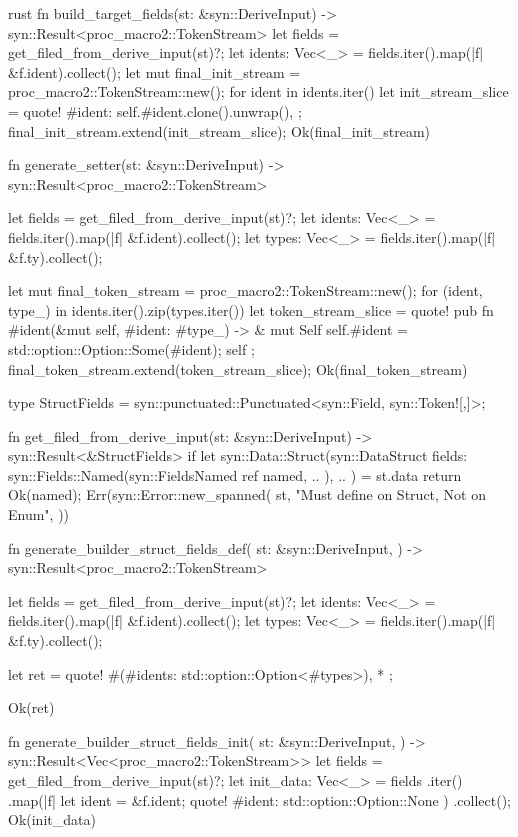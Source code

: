 \begin{code-block}{rust}
fn build_target_fields(st: &syn::DeriveInput) -> syn::Result<proc_macro2::TokenStream> {
    let fields = get_filed_from_derive_input(st)?;
    let idents: Vec<_> = fields.iter().map(|f| &f.ident).collect();
    let mut final_init_stream = proc_macro2::TokenStream::new();
    for ident in idents.iter() {
        let init_stream_slice = quote! {
            #ident: self.#ident.clone().unwrap(),
        };
        final_init_stream.extend(init_stream_slice);
    }
    Ok(final_init_stream)
}

fn generate_setter(st: &syn::DeriveInput) -> syn::Result<proc_macro2::TokenStream> {
    let fields = get_filed_from_derive_input(st)?;
    let idents: Vec<_> = fields.iter().map(|f| &f.ident).collect();
    let types: Vec<_> = fields.iter().map(|f| &f.ty).collect();

    let mut final_token_stream = proc_macro2::TokenStream::new();
    for (ident, type_) in idents.iter().zip(types.iter()) {
        let token_stream_slice = quote! {
            pub fn #ident(&mut self, #ident: #type_) -> & mut Self {
                self.#ident = std::option::Option::Some(#ident);
                self
            }
        };
        final_token_stream.extend(token_stream_slice);
    }
    Ok(final_token_stream)
}

type StructFields = syn::punctuated::Punctuated<syn::Field, syn::Token![,]>;

fn get_filed_from_derive_input(st: &syn::DeriveInput) -> syn::Result<&StructFields> {
    if let syn::Data::Struct(syn::DataStruct {
        fields: syn::Fields::Named(syn::FieldsNamed { ref named, .. }),
        ..
    }) = st.data
    {
        return Ok(named);
    }
    Err(syn::Error::new_spanned(
        st,
        "Must define on Struct, Not on Enum",
    ))
}

fn generate_builder_struct_fields_def(
    st: &syn::DeriveInput,
) -> syn::Result<proc_macro2::TokenStream> {
    let fields = get_filed_from_derive_input(st)?;
    let idents: Vec<_> = fields.iter().map(|f| &f.ident).collect();
    let types: Vec<_> = fields.iter().map(|f| &f.ty).collect();

    let ret = quote! {
        #(#idents: std::option::Option<#types>), *
    };

    Ok(ret)
}

fn generate_builder_struct_fields_init(
    st: &syn::DeriveInput,
) -> syn::Result<Vec<proc_macro2::TokenStream>> {
    let fields = get_filed_from_derive_input(st)?;
    let init_data: Vec<_> = fields
        .iter()
        .map(|f| {
            let ident = &f.ident;
            quote! {
                #ident: std::option::Option::None
            }
        })
        .collect();
    Ok(init_data)
}
\end{code-block}

